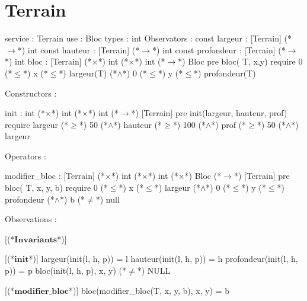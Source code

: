 \documentclass[a4paper, 11pt, notitlepage]{report}
\newcommand{\specB}[1]{\textbf{#1}}
\begin{document}
\section{Terrain}
\begin{Spe}
service : Terrain
use : Bloc
types : int
Observators :
	const largeur : [Terrain] (*$\rightarrow$*) int
	const hauteur : [Terrain] (*$\rightarrow$*) int
	const profondeur : [Terrain] (*$\rightarrow$*) int
	bloc : [Terrain] (*$\times$*) int (*$\times$*) int (*$\rightarrow$*) Bloc
		pre bloc( T, x,y) require 0 (*$\leq$*) x (*$\leq$*) largeur(T) (*$\land$*) 0 (*$\leq$*) y (*$\leq$*) profondeur(T)
	     
Constructors :

	init : int (*$\times$*) int (*$\times$*) int (*$\rightarrow$*) [Terrain]
		pre init(largeur, hauteur, prof) require largeur (*$\ge$*) 50 (*$\land$*) hauteur (*$\ge$*) 100 (*$\land$*) prof (*$\ge$*) 50 (*$\land$*) largeur%
	     
Operators : 

	modifier_bloc : [Terrain] (*$\times$*) int (*$\times$*) int (*$\times$*) Bloc (*$\rightarrow$*) [Terrain]
		pre bloc( T, x, y, b) require 0 (*$\leq$*) x (*$\leq$*) largeur (*$\land$*) 0 (*$\leq$*) y (*$\leq$*) profondeur (*$\land$*) b (*$\neq$*) null
	     
Observations :

      [(*$\specB{Invariants}$*)]
      
      [(*$\specB{init}$*)]
	    largeur(init(l, h, p)) = l
	    hauteur(init(l, h, p)) = h
	    profondeur(init(l, h, p)) = p
	    bloc(init(l, h, p), x, y) (*$\neq$*) NULL
	    
      [(*$\specB{modifier\_bloc}$*)]
	    bloc(modifier_bloc(T, x, y, b), x, y) = b 
	    
\end{Spe}
\end{document}
